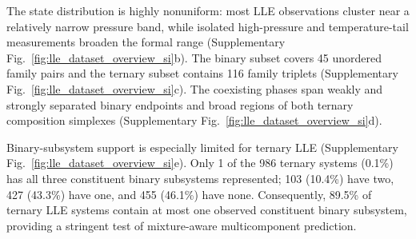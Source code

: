 The state distribution is highly nonuniform: most LLE observations cluster near a relatively narrow pressure band, while isolated high-pressure and temperature-tail measurements broaden the formal range (Supplementary Fig.~\ref{fig:lle_dataset_overview_si}b). The binary subset covers 45 unordered family pairs and the ternary subset contains 116 family triplets (Supplementary Fig.~\ref{fig:lle_dataset_overview_si}c). The coexisting phases span weakly and strongly separated binary endpoints and broad regions of both ternary composition simplexes (Supplementary Fig.~\ref{fig:lle_dataset_overview_si}d).

Binary-subsystem support is especially limited for ternary LLE (Supplementary Fig.~\ref{fig:lle_dataset_overview_si}e). Only 1 of the 986 ternary systems (0.1\%) has all three constituent binary subsystems represented; 103 (10.4\%) have two, 427 (43.3\%) have one, and 455 (46.1\%) have none. Consequently, 89.5\% of ternary LLE systems contain at most one observed constituent binary subsystem, providing a stringent test of mixture-aware multicomponent prediction.
